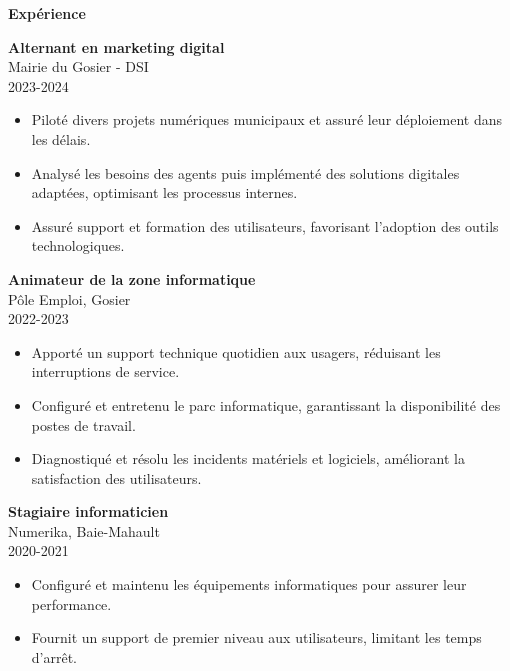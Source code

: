 \documentclass[a4paper]{article}
\renewcommand{\colorbox}[2]{#2}%
\newcommand{\cvsection}[1]{%
  \vspace{6pt}\textbf{\Large #1}\par\vspace{2pt}}
\begin{document}
\cvsection{Expérience}
\begin{adjustwidth}{2.2cm}{0pt}      %
  
\colorbox{maincolor}{%
  \begin{minipage}{\linewidth}
    \textbf{Alternant en marketing digital} \\ Mairie du Gosier - DSI \\ 2023-2024
    \begin{itemize}
      \item Piloté divers projets numériques municipaux et assuré leur déploiement dans les délais. \item Analysé les besoins des agents puis implémenté des solutions digitales adaptées, optimisant les processus internes. \item Assuré support et formation des utilisateurs, favorisant l’adoption des outils technologiques.
    \end{itemize}
  \end{minipage}}

\vspace{3mm}


\colorbox{maincolor}{%
  \begin{minipage}{\linewidth}
    \textbf{Animateur de la zone informatique} \\ Pôle Emploi, Gosier \\ 2022-2023
    \begin{itemize}
      \item Apporté un support technique quotidien aux usagers, réduisant les interruptions de service. \item Configuré et entretenu le parc informatique, garantissant la disponibilité des postes de travail. \item Diagnostiqué et résolu les incidents matériels et logiciels, améliorant la satisfaction des utilisateurs.
    \end{itemize}
  \end{minipage}}

\vspace{3mm}


\colorbox{maincolor}{%
  \begin{minipage}{\linewidth}
    \textbf{Stagiaire informaticien} \\ Numerika, Baie-Mahault \\ 2020-2021
    \begin{itemize}
      \item Configuré et maintenu les équipements informatiques pour assurer leur performance. \item Fournit un support de premier niveau aux utilisateurs, limitant les temps d’arrêt.
    \end{itemize}
  \end{minipage}}
\end{adjustwidth}
\end{document}
